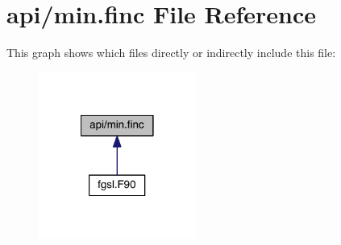 \hypertarget{min_8finc}{\section{api/min.finc File Reference}
\label{min_8finc}
}
This graph shows which files directly or indirectly include this file\-:\nopagebreak
\begin{figure}[H]
\begin{center}
\leavevmode
\includegraphics[width=146pt]{min_8finc__dep__incl}
\end{center}
\end{figure}
